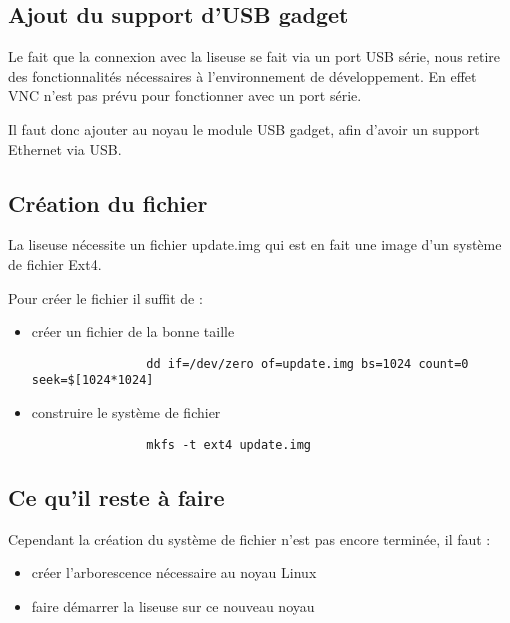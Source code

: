  \subsection{Ajout du support d'USB gadget}
 
 Le fait que la connexion avec la liseuse se fait via un port USB série, nous retire des fonctionnalités nécessaires à l'environnement de développement. En effet VNC n'est pas prévu pour fonctionner avec un port série.
 
 Il faut donc ajouter au noyau le module USB gadget, afin d'avoir un support Ethernet via USB.

\subsection{Création du fichier}

La liseuse nécessite un fichier update.img qui est en fait une image d'un système de fichier Ext4.

Pour créer le fichier il suffit de : 
	\begin{itemize}
		\item créer un fichier de la bonne taille \\
			\begin{verbatim}
				dd if=/dev/zero of=update.img bs=1024 count=0 seek=$[1024*1024]
			\end{verbatim}
		\item construire le système de fichier \\
			\begin{verbatim}
				mkfs -t ext4 update.img
			\end{verbatim}
	\end{itemize}

\subsection{Ce qu'il reste à faire}

Cependant la création du système de fichier n'est pas encore terminée, il faut :
	\begin{itemize}
		\item créer l'arborescence nécessaire au noyau Linux
		\item faire démarrer la liseuse sur ce nouveau noyau
	\end{itemize}